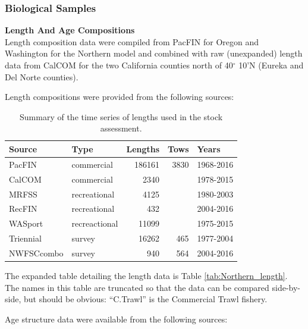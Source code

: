\documentclass[12pt,]{article}
\begin{document}
\subsubsection{Biological Samples}\label{biological-samples}

\textbf{Length And Age Compositions}\\
Length composition data were compiled from PacFIN for Oregon and
Washington for the Northern model and combined with raw (unexpanded)
length data from CalCOM for the two California counties north of
40\(^\circ\) 10'N (Eureka and Del Norte counties).

Length compositions were provided from the following sources:

\vspace{.5cm}

\begin{table}[ht]
\centering
\caption{Summary of the time series of lengths used in the stock assessment.} 
\label{tab:Length_sources}
\begin{tabular}{llrrl}
  \hline
Source & Type & Lengths & Tows & Years \\ 
  \hline
PacFIN & commercial & 186161 & 3830 & 1968-2016 \\ 
  CalCOM & commercial & 2340 &  & 1978-2015 \\ 
  MRFSS & recreational & 4125 &  & 1980-2003 \\ 
  RecFIN & recreational & 432 &  & 2004-2016 \\ 
  WASport & recreactional & 11099 &  & 1975-2015 \\ 
  Triennial & survey & 16262 & 465 & 1977-2004 \\ 
  NWFSCcombo & survey & 940 & 564 & 2004-2016 \\ 
   \hline
\end{tabular}
\end{table}

The expanded table detailing the length data is Table
\ref{tab:Northern_length}. The names in this table are truncated so that
the data can be compared side-by-side, but should be obvious:
``C.Trawl'' is the Commercial Trawl fishery.

Age structure data were available from the following sources:
\vspace{.5cm}
\end{document}
